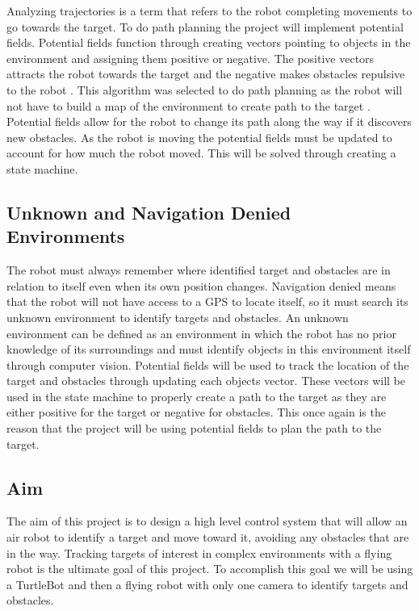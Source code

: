 \documentclass{article}
\begin{document}
	Analyzing trajectories is a term that refers to the robot completing movements to go towards the target. To do path planning the project will implement potential fields. Potential fields function through creating vectors pointing to objects in the environment and assigning them positive or negative. The positive vectors attracts the robot towards the target and the negative makes obstacles repulsive to the robot \cite{hwang1992potential}. This algorithm was selected to do path planning as the robot will not have to build a map of the environment to create path to the target \cite{bortoff2000path}. Potential fields allow for the robot to change its path along the way if it discovers new obstacles. As the robot is moving the potential fields must be updated to account for how much the robot moved. This will be solved through creating a state machine. 

	\subsection{Unknown and Navigation Denied Environments}

	The robot must always remember where identified target and obstacles are in relation to itself even when its own position changes. Navigation denied means that the robot will not have access to a GPS to locate itself, so it must search its unknown environment to identify targets and obstacles. An unknown environment can be defined as an environment in which the robot has no prior knowledge of its surroundings and must identify objects in this environment itself through computer vision. Potential fields will be used to track the location of the target and obstacles through updating each objects vector. These vectors will be used in the state machine to properly create a path to the target as they are either positive for the target or negative for obstacles. This once again is the reason that the project will be using potential fields to plan the path to the target. 

	\subsection{Aim}
	
	The aim of this project is to design a high level control system that will allow an air robot to identify a target and move toward it, avoiding any obstacles that are in the way. Tracking targets of interest in complex environments with a flying robot is the ultimate goal of this project. To accomplish this goal we will be using a TurtleBot and then a flying robot with only one camera to identify targets and obstacles. 
\end{document}
